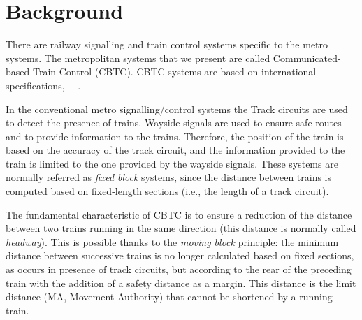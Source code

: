 \documentclass{ewic}
\begin{document}
			\section{Background}
			
			There are railway signalling and train control systems specific to the metro systems. The metropolitan systems that we present are called Communicated-based Train Control (CBTC). CBTC systems are based on international specifications,~\cite{ieee1474} ~\cite{cei2007}.
			
			In the conventional metro signalling/control systems the Track circuits are used to detect the presence of trains. Wayside signals are used to ensure safe routes and to provide information to the trains. Therefore, the position of the train is based on the accuracy of the track circuit, and the information provided to the train is limited to the one provided by the wayside signals. These systems are normally referred as \emph{fixed block} systems, since the distance between trains is computed based on fixed-length sections (i.e., the length of a track circuit).
			
			
			The fundamental characteristic of CBTC is to ensure a reduction of the distance between two trains running in the same direction (this distance is normally called \emph{headway}). This is possible thanks to the \emph{moving block} principle: the minimum distance between successive trains is no longer calculated based on fixed sections, as occurs in presence of track circuits, but according to the rear of the preceding train with the addition of a safety distance as a margin. This distance is the limit distance (MA, Movement Authority) that cannot be shortened by a running train. 
			
\end{document}
